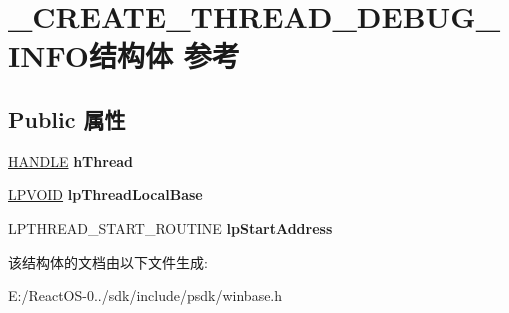 \hypertarget{struct___c_r_e_a_t_e___t_h_r_e_a_d___d_e_b_u_g___i_n_f_o}{}\section{\+\_\+\+C\+R\+E\+A\+T\+E\+\_\+\+T\+H\+R\+E\+A\+D\+\_\+\+D\+E\+B\+U\+G\+\_\+\+I\+N\+F\+O结构体 参考}
\label{struct___c_r_e_a_t_e___t_h_r_e_a_d___d_e_b_u_g___i_n_f_o}
\subsection*{Public 属性}
\begin{DoxyCompactItemize}
\item 
\mbox{\label{struct___c_r_e_a_t_e___t_h_r_e_a_d___d_e_b_u_g___i_n_f_o_a2b6f176ce2460e08c10c1d764a207301}} 
\hyperlink{interfacevoid}{H\+A\+N\+D\+LE} {\bfseries h\+Thread}
\item 
\mbox{\label{struct___c_r_e_a_t_e___t_h_r_e_a_d___d_e_b_u_g___i_n_f_o_aead922a79f7f141043c44bfefa4ac1e1}} 
\hyperlink{interfacevoid}{L\+P\+V\+O\+ID} {\bfseries lp\+Thread\+Local\+Base}
\item 
\mbox{\label{struct___c_r_e_a_t_e___t_h_r_e_a_d___d_e_b_u_g___i_n_f_o_a4e4d52e6e7ff2cd0d25e83389a546f63}} 
L\+P\+T\+H\+R\+E\+A\+D\+\_\+\+S\+T\+A\+R\+T\+\_\+\+R\+O\+U\+T\+I\+NE {\bfseries lp\+Start\+Address}
\end{DoxyCompactItemize}


该结构体的文档由以下文件生成\+:\begin{DoxyCompactItemize}
\item 
E\+:/\+React\+O\+S-\/0../sdk/include/psdk/winbase.\+h\end{DoxyCompactItemize}
